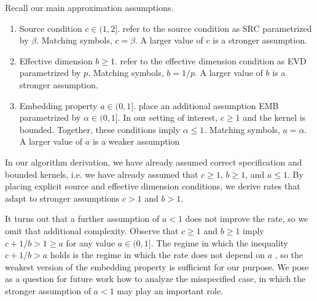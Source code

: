 \begin{remark}
Recall our main approximation assumptions.
\begin{enumerate}
    \item Source condition $c\in(1,2]$. \cite{fischer2017sobolev} refer to the source condition as SRC parametrized by $\beta$. Matching symbols, $c=\beta$. A larger value of $c$ is a stronger assumption.
    \item Effective dimension $b\geq 1$. \cite{fischer2017sobolev} refer to the effective dimension condition as EVD parametrized by $p$. Matching symbols, $b=1/p$. A larger value of $b$ is a stronger assumption.
    \item Embedding property $a\in(0,1]$. \cite{fischer2017sobolev} place an additional assumption EMB parametrized by $\alpha\in(0,1]$. In our setting of interest, $c\geq 1$ and the kernel is bounded. Together, these conditions imply $\alpha\leq  1$. Matching symbols, $a=\alpha$. A larger value of $a$ is a weaker assumption
\end{enumerate}
\end{remark}

In our algorithm derivation, we have already assumed correct specification and bounded kernels, i.e. we have already assumed that $c\geq 1$, $b\geq 1$, and $a\leq 1$. By placing explicit source and effective dimension conditions, we derive rates that adapt to stronger assumptions $c>1$ and $b>1$. 

It turns out that a further assumption of $a<1$ does not improve the rate, so we omit that additional complexity. Observe that $c\geq 1$ and $b\geq 1$ imply $c+1/b>1 \geq a$ for any value $a\in(0,1]$. The regime in which the inequality $c+1/b>a$ holds is the regime in which the rate does not depend on $a$ \cite[Theorem 1.ii]{fischer2017sobolev}, so the weakest version of the embedding property is sufficient for our purpose. We pose as a question for future work how to analyze the misspecified case, in which the stronger assumption of $a<1$ may play an important role.


